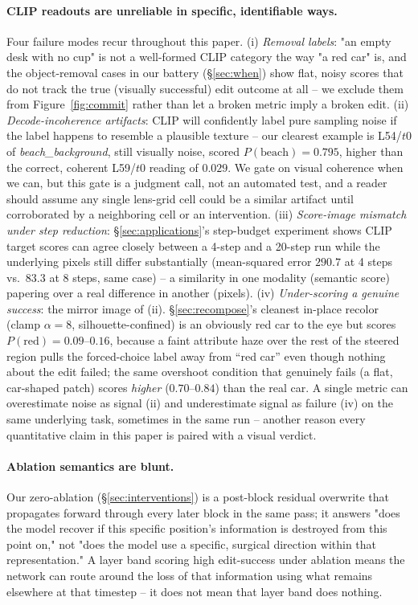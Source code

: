 \documentclass[10pt,twocolumn]{article}
\begin{document}
\paragraph{CLIP readouts are unreliable in specific, identifiable ways.}
Four failure modes recur throughout this paper. (i) \emph{Removal
labels}: "an empty desk with no cup" is not a well-formed CLIP category
the way "a red car" is, and the object-removal cases in our battery
(\S\ref{sec:when}) show flat, noisy scores that do not track the true
(visually successful) edit outcome at all -- we exclude them from
Figure~\ref{fig:commit} rather than let a broken metric imply a broken
edit. (ii) \emph{Decode-incoherence artifacts}: CLIP will confidently
label pure sampling noise if the label happens to resemble a plausible
texture -- our clearest example is L54/$t$0 of \emph{beach\_background},
still visually noise, scored $P(\text{beach})=0.795$, higher than the
correct, coherent L59/$t$0 reading of $0.029$. We gate on visual
coherence when we can, but this gate is a judgment call, not an
automated test, and a reader should assume any single lens-grid cell
could be a similar artifact until corroborated by a neighboring cell or
an intervention. (iii) \emph{Score-image mismatch under step reduction}:
\S\ref{sec:applications}'s step-budget experiment shows CLIP target
scores can agree closely between a 4-step and a 20-step run while the
underlying pixels still differ substantially (mean-squared error
$290.7$ at 4 steps vs.\ $83.3$ at 8 steps, same case) -- a similarity in
one modality (semantic score) papering over a real difference in
another (pixels). (iv) \emph{Under-scoring a genuine success}: the
mirror image of (ii). \S\ref{sec:recompose}'s cleanest in-place recolor
(clamp $\alpha{=}8$, silhouette-confined) is an obviously red car to the
eye but scores $P(\text{red})=0.09$--$0.16$, because a faint attribute
haze over the rest of the steered region pulls the forced-choice label
away from ``red car'' even though nothing about the edit failed; the
same overshoot condition that genuinely fails (a flat, car-shaped patch)
scores \emph{higher} ($0.70$--$0.84$) than the real car. A single metric
can overestimate noise as signal (ii) and underestimate signal as
failure (iv) on the same underlying task, sometimes in the same run --
another reason every quantitative claim in this paper is paired with a
visual verdict.

\paragraph{Ablation semantics are blunt.} Our zero-ablation
(\S\ref{sec:interventions}) is a post-block residual overwrite that
propagates forward through every later block in the same pass; it
answers "does the model recover if this specific position's information
is destroyed from this point on," not "does the model use a specific,
surgical direction within that representation." A layer band scoring
high edit-success under ablation means the network can route around the
loss of that information using what remains elsewhere at that
timestep -- it does not mean that layer band does nothing.
\end{document}
